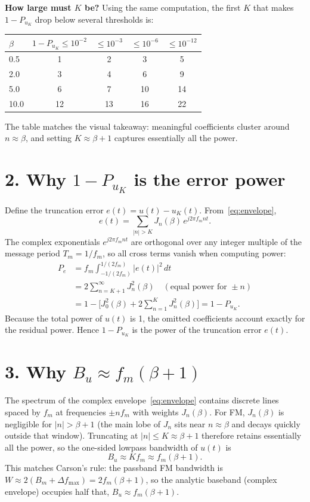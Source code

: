 \documentclass[11pt]{article}
\begin{document}
\textbf{How large must $K$ be?} Using the same computation, the first $K$ that makes $1-P_{u_K}$ drop below several thresholds is:
\begin{center}
\begin{tabular}{@{}lcccc@{}}
\toprule
$\beta$ & $1-P_{u_K}\!\le\!10^{-2}$ & $\le\!10^{-3}$ & $\le\!10^{-6}$ & $\le\!10^{-12}$\\
\midrule
0.5 & 1 & 2 & 3 & 5\\
2.0 & 3 & 4 & 6 & 9\\
5.0 & 6 & 7 & 10 & 14\\
10.0 & 12 & 13 & 16 & 22\\
\bottomrule
\end{tabular}
\end{center}
The table matches the visual takeaway: meaningful coefficients cluster around $n\approx\beta$, and setting $K\approx\beta+1$ captures essentially all the power.

\section*{2. Why $1-P_{u_K}$ is the error power}
Define the truncation error $e(t)=u(t)-u_K(t)$. From~\eqref{eq:envelope},
\begin{equation}
e(t)=\sum_{|n|>K}J_n(\beta)\,e^{j2\pi f_m n t}.
\end{equation}
The complex exponentials $e^{j2\pi f_m n t}$ are orthogonal over any integer multiple of the message period $T_m=1/f_m$, so all cross terms vanish when computing power:
\begin{align}
P_e &= f_m \int_{-1/(2f_m)}^{1/(2f_m)} |e(t)|^2\,dt \\
    &= 2\sum_{n=K+1}^{\infty} J_n^2(\beta) \quad (\text{equal power for } \pm n)\\
    &= 1 - \bigl[J_0^2(\beta)+2\sum_{n=1}^{K}J_n^2(\beta)\bigr] = 1-P_{u_K}.
\end{align}
Because the total power of $u(t)$ is 1, the omitted coefficients account exactly for the residual power. Hence $1-P_{u_K}$ is the power of the truncation error $e(t)$.

\section*{3. Why $B_u \approx f_m(\beta+1)$}
The spectrum of the complex envelope~\eqref{eq:envelope} contains discrete lines spaced by $f_m$ at frequencies $\pm n f_m$ with weights $J_n(\beta)$. For FM, $J_n(\beta)$ is negligible for $|n|>\beta+1$ (the main lobe of $J_n$ sits near $n\approx\beta$ and decays quickly outside that window). Truncating at $|n|\le K\approx\beta+1$ therefore retains essentially all the power, so the one-sided lowpass bandwidth of $u(t)$ is
\[
B_u \approx K f_m \approx f_m(\beta+1).
\]
This matches Carson's rule: the passband FM bandwidth is $W\approx 2(B_m+\Delta f_{\max})=2f_m(\beta+1)$, so the analytic baseband (complex envelope) occupies half that, $B_u\approx f_m(\beta+1)$.
\end{document}
